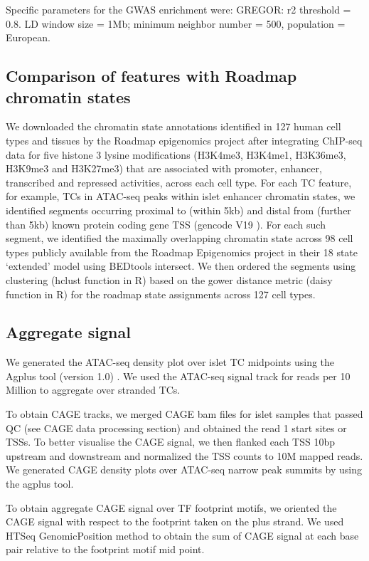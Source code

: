 Specific parameters for the GWAS enrichment were: GREGOR: r2 threshold = 0.8. LD window size = 1Mb; minimum neighbor number = 500, population = European.
         
\subsection{Comparison of features with Roadmap chromatin states}
We downloaded the chromatin state annotations identified in 127 human cell types and tissues by the Roadmap epigenomics project \cite{theroadmapepigenomicsconsortiumIntegrativeAnalysis1112015} after integrating ChIP-seq data for five histone 3 lysine modifications (H3K4me3, H3K4me1, H3K36me3, H3K9me3 and H3K27me3) that are associated with promoter, enhancer, transcribed and repressed activities, across each cell type. For each TC feature, for example, TCs in ATAC-seq peaks within islet enhancer chromatin states, we identified segments occurring proximal to (within 5kb) and distal from (further than 5kb) known protein coding gene TSS (gencode V19 \cite{harrowGENCODEReferenceHuman2012}). For each such segment, we identified the maximally overlapping chromatin state across 98 cell types publicly available from the Roadmap Epigenomics project in their 18 state ‘extended’ model using BEDtools intersect. We then ordered the segments using clustering (hclust function in R) based on the gower distance metric (daisy function in R) for the roadmap state assignments across 127 cell types.


\subsection{Aggregate signal}
We generated the ATAC-seq density plot over islet TC midpoints using the Agplus tool (version 1.0) \cite{maeharaAgplusRapidFlexible2015}. We used the ATAC-seq signal track for reads per 10 Million to aggregate over stranded TCs. 


To obtain CAGE tracks, we merged CAGE bam files for islet samples that passed QC (see CAGE data processing section) and obtained the read 1 start sites or TSSs. To better visualise the CAGE signal, we then flanked each TSS 10bp upstream and downstream and normalized the TSS counts to 10M mapped reads.   We generated CAGE density plots over ATAC-seq narrow peak summits by using the agplus tool.  


To obtain aggregate CAGE signal over TF footprint motifs, we oriented the CAGE signal with respect to the footprint taken on the plus strand. We used HTSeq GenomicPosition method \cite{andersHTSeqPythonFramework2015} to obtain the sum of CAGE signal at each base pair relative to the footprint motif mid point.


